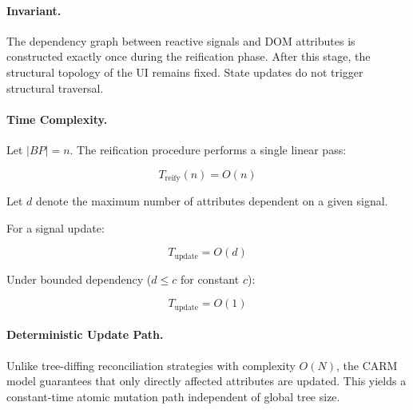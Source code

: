 \paragraph{Invariant.}
The dependency graph between reactive signals and DOM attributes
is constructed exactly once during the reification phase.
After this stage, the structural topology of the UI remains fixed.
State updates do not trigger structural traversal.

\paragraph{Time Complexity.}

Let $|BP| = n$.  
The reification procedure performs a single linear pass:

\[
T_{\text{reify}}(n) = O(n)
\]

Let $d$ denote the maximum number of attributes dependent on a given signal.

For a signal update:

\[
T_{\text{update}} = O(d)
\]

Under bounded dependency ($d \leq c$ for constant $c$):

\[
T_{\text{update}} = O(1)
\]

\paragraph{Deterministic Update Path.}
Unlike tree-diffing reconciliation strategies with complexity $O(N)$,
the CARM model guarantees that only directly affected attributes are updated.
This yields a constant-time atomic mutation path independent of global tree size.
